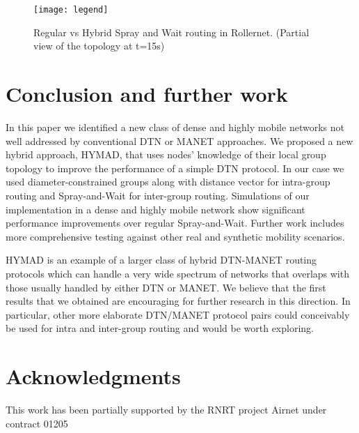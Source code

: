 \documentclass[10pt,twocolumn,letterpaper]{article}
\begin{document}
\begin{figure*}[t]
  \centering
  \texttt{[image: legend]} \\
   \quad
  \caption{Regular vs Hybrid Spray and Wait routing in Rollernet. (Partial view of the topology at t=15s)}
  \label{diffusion}
\end{figure*}


\section{Conclusion and further work}
\label{conclusion}
In this paper we identified a new class of dense and highly mobile
networks not well addressed by conventional DTN or MANET approaches. We
proposed a new hybrid approach, HYMAD, that uses nodes' knowledge of
their local group topology to improve the performance of a simple DTN
protocol. In our case we used diameter-constrained groups along with
distance vector for intra-group routing and Spray-and-Wait for
inter-group routing. Simulations of our implementation in a dense and
highly mobile network show significant performance improvements over
regular Spray-and-Wait. Further work includes more comprehensive testing
against other real and synthetic mobility scenarios.

HYMAD is an example of a larger class of hybrid DTN-MANET routing
protocols which can handle a very wide spectrum of networks that
overlaps with those usually handled by either DTN or MANET.  We
believe that the first results that we obtained are encouraging for
further research in this direction. In particular, other more
elaborate DTN/MANET protocol pairs could conceivably be used for intra
and inter-group routing and would be worth exploring.

\section*{Acknowledgments}
This work has been partially supported by the RNRT project Airnet under contract
01205

\small
 

\end{document}
